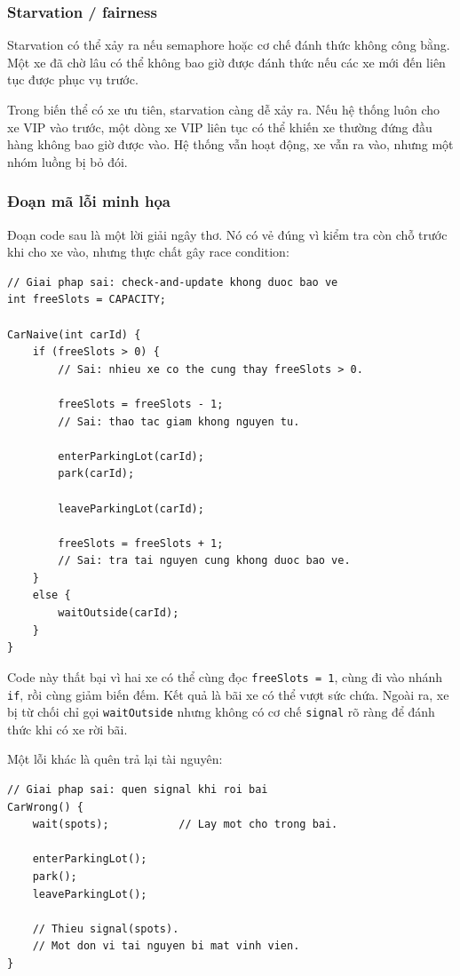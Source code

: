 \subsubsection*{Starvation / fairness}

Starvation có thể xảy ra nếu semaphore hoặc cơ chế đánh thức không công
bằng. Một xe đã chờ lâu có thể không bao giờ được đánh thức nếu các xe mới
đến liên tục được phục vụ trước.

Trong biến thể có xe ưu tiên, starvation càng dễ xảy ra. Nếu hệ thống luôn
cho xe VIP vào trước, một dòng xe VIP liên tục có thể khiến xe thường đứng
đầu hàng không bao giờ được vào. Hệ thống vẫn hoạt động, xe vẫn ra vào,
nhưng một nhóm luồng bị bỏ đói.

\subsubsection*{Đoạn mã lỗi minh họa}

Đoạn code sau là một lời giải ngây thơ. Nó có vẻ đúng vì kiểm tra còn chỗ
trước khi cho xe vào, nhưng thực chất gây race condition:

\begin{lstlisting}
// Giai phap sai: check-and-update khong duoc bao ve
int freeSlots = CAPACITY;

CarNaive(int carId) {
    if (freeSlots > 0) {
        // Sai: nhieu xe co the cung thay freeSlots > 0.

        freeSlots = freeSlots - 1;
        // Sai: thao tac giam khong nguyen tu.

        enterParkingLot(carId);
        park(carId);

        leaveParkingLot(carId);

        freeSlots = freeSlots + 1;
        // Sai: tra tai nguyen cung khong duoc bao ve.
    }
    else {
        waitOutside(carId);
    }
}
\end{lstlisting}

Code này thất bại vì hai xe có thể cùng đọc \texttt{freeSlots = 1}, cùng
đi vào nhánh \texttt{if}, rồi cùng giảm biến đếm. Kết quả là bãi xe có thể
vượt sức chứa. Ngoài ra, xe bị từ chối chỉ gọi \texttt{waitOutside} nhưng
không có cơ chế \texttt{signal} rõ ràng để đánh thức khi có xe rời bãi.

Một lỗi khác là quên trả lại tài nguyên:

\begin{lstlisting}
// Giai phap sai: quen signal khi roi bai
CarWrong() {
    wait(spots);           // Lay mot cho trong bai.

    enterParkingLot();
    park();
    leaveParkingLot();

    // Thieu signal(spots).
    // Mot don vi tai nguyen bi mat vinh vien.
}
\end{lstlisting}

